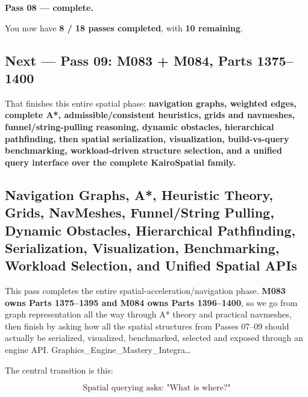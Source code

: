 \textbf{Pass 08 --- complete.}

You now have \textbf{8 / 18 passes completed}, with \textbf{10 remaining}.

\subsection{Next --- Pass 09: M083 + M084, Parts 1375--1400}\label{06-engine-ii-ch030-next-pass-09-m083-m084-parts-13751400}

\hypertarget{06-engine-ii-ch030-next-pass-09-m083-m084-parts-13751400}{}

That finishes this entire spatial phase: \textbf{navigation graphs, weighted edges, complete A*, admissible/consistent heuristics, grids and navmeshes, funnel/string-pulling reasoning, dynamic obstacles, hierarchical pathfinding, then spatial serialization, visualization, build-vs-query benchmarking, workload-driven structure selection, and a unified query interface over the complete KairoSpatial family.}

\subsection{Navigation Graphs, A*, Heuristic Theory, Grids, NavMeshes, Funnel/String Pulling, Dynamic Obstacles, Hierarchical Pathfinding, Serialization, Visualization, Benchmarking, Workload Selection, and Unified Spatial APIs}\label{06-engine-ii-ch030-navigation-graphs-a-heuristic-theory-grids-navmeshes-funnelstring-pulling-dynamic-obstacles-hierarchical-pathfinding-serialization-visualization-benchmarking-workload-selection-and-unified-spatial-apis}

\hypertarget{06-engine-ii-ch030-navigation-graphs-a-heuristic-theory-grids-navmeshes-funnelstring-pulling-dynamic-obstacles-hierarchical-pathfinding-serialization-visualization-benchmarking-workload-selection-and-unified-spatial-apis}{}

This pass completes the entire spatial-acceleration/navigation phase. \textbf{M083 owns Parts 1375--1395 and M084 owns Parts 1396--1400}, so we go from graph representation all the way through A* theory and practical navmeshes, then finish by asking how all the spatial structures from Passes 07--09 should actually be serialized, visualized, benchmarked, selected and exposed through an engine API. Graphics\_Engine\_Mastery\_Integra\ldots{}

The central transition is this:

\[
\text{Spatial querying asks: "What is where?"}
\]

